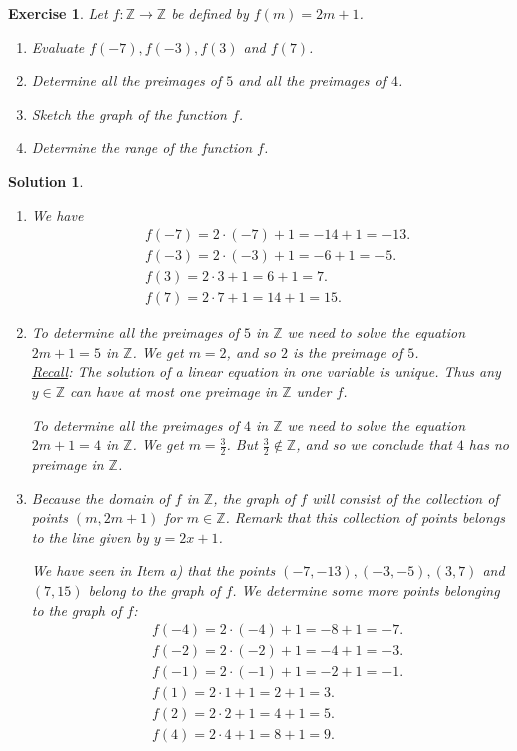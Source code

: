 \documentclass[12pt]{article}
\newtheorem{ex}{Exercise}[section]
\newtheorem{sol}[prop]{Solution}
\begin{document}
\begin{ex}
Let $f:\mathbb{Z}\to \mathbb{Z}$ be defined by $f(m)=2m+1$.
\begin{enumerate}
\item[a)]  Evaluate $f(-7), f(-3), f(3)$ and $f(7)$.
\item[b)] Determine all the preimages of $5$ and all the preimages of $4$.
\item[c)] Sketch the graph of the function $f$.
\item[d)] Determine the range of the function $f$.
\end{enumerate}
\end{ex}

\begin{sol}
\begin{enumerate}
\item[a)]  We have 
\begin{equation*}
\begin{split}
& f(-7)=2\cdot (-7)+1=-14+1=-13.\\
& f(-3)=2\cdot (-3)+1=-6+1=-5.\\
& f(3)=2\cdot 3+1=6+1=7.\\
& f(7)=2\cdot 7+1=14+1=15.
\end{split}
\end{equation*}
\item[b)] To determine all the preimages of $5$ in $\mathbb{Z}$ we need to solve the equation $2m+1=5$ in $\mathbb{Z}$. We get $m=2$, and so $2$ is the preimage of $5$. \\
\underline{Recall}: The solution of a linear equation in one variable is unique. Thus any $y\in \mathbb{Z}$ can have at most one preimage in $\mathbb{Z}$ under $f$.

To determine all the preimages of $4$ in $\mathbb{Z}$ we need to solve the equation $2m+1=4$ in $\mathbb{Z}$. We get $m=\frac{3}{2}$. But $\frac{3}{2}\notin \mathbb{Z}$, and so we conclude that $4$ has no preimage in $\mathbb{Z}$. 
\item[c)] Because the domain of $f$ in $\mathbb{Z}$, the graph of $f$ will consist of the collection of points $(m,2m+1)$ for $m\in \mathbb{Z}$. Remark that this collection of points belongs to the line given by $y=2x+1$.

We have seen in Item a) that the points $(-7,-13), (-3,-5), (3,7)$ and $(7,15)$ belong to the graph of $f$. We determine some more points belonging to the graph of $f$:
\begin{equation*}
\begin{split}
& f(-4)=2\cdot (-4)+1=-8+1=-7.\\
& f(-2)=2\cdot (-2)+1=-4+1=-3.\\
& f(-1)=2\cdot (-1)+1=-2+1=-1.\\
& f(1)=2\cdot 1+1=2+1=3.\\
& f(2)=2\cdot 2+1=4+1=5.\\
& f(4)=2\cdot 4+1=8+1=9.
\end{split}
\end{equation*}


\end{enumerate}
\end{sol}
\end{document}
